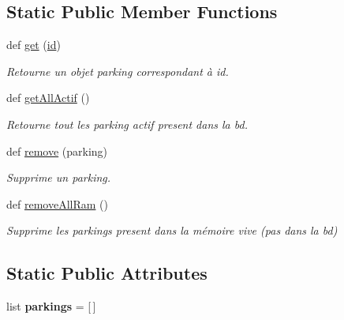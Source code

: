 \subsection*{Static Public Member Functions}
\begin{DoxyCompactItemize}
\item 
def \hyperlink{classm_1_1_parking_1_1_parking_ab1397f69069537d0f033d1525b6ddf03}{get} (\hyperlink{classm_1_1_parking_1_1_parking_a6dbfe7e9f3885937358ba7d4974b9f9e}{id})
\begin{DoxyCompactList}\small\item\em Retourne un objet parking correspondant à id. \end{DoxyCompactList}\item 
\hypertarget{classm_1_1_parking_1_1_parking_af31c6866459b473f90eb62c98b7c3579}{}def \hyperlink{classm_1_1_parking_1_1_parking_af31c6866459b473f90eb62c98b7c3579}{get\+All\+Actif} ()\label{classm_1_1_parking_1_1_parking_af31c6866459b473f90eb62c98b7c3579}

\begin{DoxyCompactList}\small\item\em Retourne tout les parking actif present dans la bd. \end{DoxyCompactList}\item 
def \hyperlink{classm_1_1_parking_1_1_parking_abd2a53415c822153a8e7a5e189aecbfa}{remove} (parking)
\begin{DoxyCompactList}\small\item\em Supprime un parking. \end{DoxyCompactList}\item 
\hypertarget{classm_1_1_parking_1_1_parking_a3c77d86df2da860ca55b1f6400dee3ce}{}def \hyperlink{classm_1_1_parking_1_1_parking_a3c77d86df2da860ca55b1f6400dee3ce}{remove\+All\+Ram} ()\label{classm_1_1_parking_1_1_parking_a3c77d86df2da860ca55b1f6400dee3ce}

\begin{DoxyCompactList}\small\item\em Supprime les parkings present dans la mémoire vive (pas dans la bd) \end{DoxyCompactList}\end{DoxyCompactItemize}
\subsection*{Static Public Attributes}
\begin{DoxyCompactItemize}
\item 
\hypertarget{classm_1_1_parking_1_1_parking_a166f6b42629968c0d1185fd23e7682a5}{}list {\bfseries parkings} = \mbox{[}$\,$\mbox{]}\label{classm_1_1_parking_1_1_parking_a166f6b42629968c0d1185fd23e7682a5}

\end{DoxyCompactItemize}


